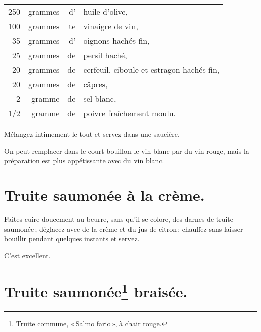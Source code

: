 \footnotesize
\begin{longtable}{rrrp{16em}}
    250 & grammes & d' & huile d'olive,                                                                   \\
    100 & grammes & te & vinaigre de vin,                                                                 \\
     35 & grammes & d' & oignons hachés fin,                                                              \\
     25 & grammes & de & persil haché,                                                                    \\
     20 & grammes & de & cerfeuil, ciboule et estragon hachés fin,                                        \\
     20 & grammes & de & câpres,                                                                          \\
      2 & gramme  & de & sel blanc,                                                                       \\
    1/2 & gramme  & de & poivre fraîchement moulu.                                                        \\
\end{longtable}
\normalsize

Mélangez intimement le tout et servez dans une saucière.

\sk

On peut remplacer dans le court-bouillon le vin blanc par du vin rouge, mais la
préparation est plus appétissante avec du vin blanc.

\section*{\centering Truite saumonée à la crème.}

Faites cuire doucement au beurre, sans qu'il se colore, des darnes de truite
saumonée ; déglacez avec de la crème et du jus de citron ; chauffez sans
laisser bouillir pendant quelques instants et servez.

C'est excellent.

\section*{\centering Truite saumonée\footnote{Truite commune, « Salmo fario », à chair rouge.} braisée.}

